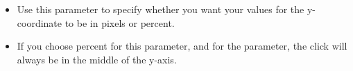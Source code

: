 %
\begin{itemize}
\item Use this parameter to specify whether you want your values for the y-coordinate to be in pixels or percent.
\item If you choose percent for  this parameter, and  for the  parameter, the click will always be in the middle of the y-axis.
\end{itemize}
